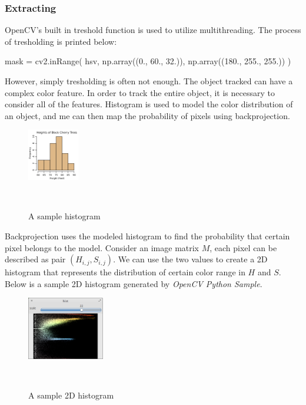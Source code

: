 \subsubsection{Extracting}
OpenCV's built in treshold function is used to utilize multithreading.
The process of tresholding is printed below:
\begin{python}
mask = cv2.inRange( hsv, 
                    np.array((0., 60., 32.)), 
                    np.array((180., 255., 255.))
                    )
\end{python}
However, simply tresholding is often not enough. The object tracked can have a complex color feature. In order to track the entire object, it is necessary to consider all of the features. Histogram is used to model the color distribution of an object, and me can then map the probability of pixels using backprojection.\\
\begin{figure}[h!]

  \centering
    \includegraphics[width=0.2\textwidth]{../Pictures/histogram.JPG}
    \caption{A sample histogram\cite{cite5}}\\
\end{figure}
Backprojection uses the modeled histogram to find the probability that certain pixel belongs to the model. Consider an image matrix $M$, each pixel can be described as pair $(H_{i,j},S_{i,j})$. We can use the two values to create a 2D histogram that represents the distribution of certain color range in $H$ and $S$. Below is a sample 2D histogram generated by \emph{OpenCV Python Sample}.\\
\begin{figure}[h!]

  \centering
    \includegraphics[width=0.3\textwidth]{../Pictures/2dhist.png}
    \caption{A sample 2D histogram}\\
\end{figure}
